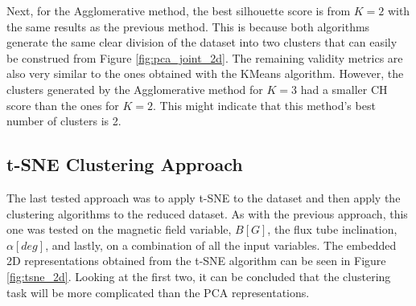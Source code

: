 Next, for the Agglomerative method, the best silhouette score is from $K=2$ with the same results as the previous method. This is because both algorithms generate the same clear division of the dataset into two clusters that can easily be construed from Figure \ref{fig:pca_joint_2d}. The remaining validity metrics are also very similar to the ones obtained with the KMeans algorithm. However, the clusters generated by the Agglomerative method for $K=3$ had a smaller CH score than the ones for $K=2$. This might indicate that this method's best number of clusters is 2.



\subsection{t-SNE Clustering Approach}\label{sec:tsne_clustering}
The last tested approach was to apply t-SNE to the dataset and then apply the clustering algorithms to the reduced dataset. As with the previous approach, this one was tested on the magnetic field variable, $B[G]$, the flux tube inclination, $\alpha [deg]$, and lastly, on a combination of all the input variables. The embedded 2D representations obtained from the t-SNE algorithm can be seen in Figure \ref{fig:tsne_2d}. Looking at the first two, it can be concluded that the clustering task will be more complicated than the PCA representations.

